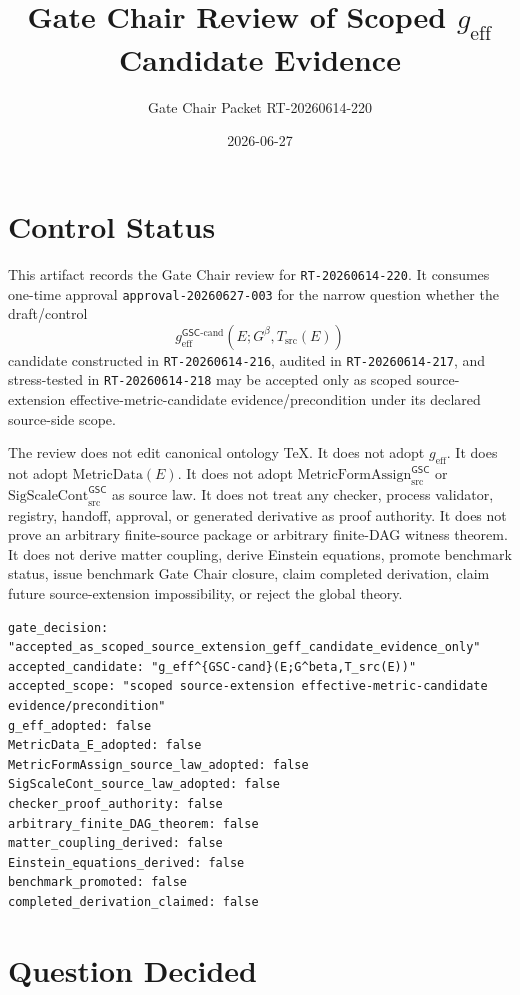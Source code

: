 \documentclass[11pt]{article}
\title{Gate Chair Review of Scoped \texorpdfstring{$g_{\mathrm{eff}}$}{g_eff} Candidate Evidence}
\author{Gate Chair Packet RT-20260614-220}
\date{2026-06-27}
\newcommand{\Gbeta}{G^\beta}
\newcommand{\SigScaleCont}{\mathrm{SigScaleCont}^{\mathsf{GSC}}_{\mathrm{src}}}
\newcommand{\MetricFormAssign}{\mathrm{MetricFormAssign}^{\mathsf{GSC}}_{\mathrm{src}}}
\newcommand{\geff}{g_{\mathrm{eff}}}
\newcommand{\geffCand}{g_{\mathrm{eff}}^{\mathsf{GSC}\mbox{-}\mathrm{cand}}}
\begin{document}
\maketitle

\section{Control Status}

This artifact records the Gate Chair review for \texttt{RT-20260614-220}. It
consumes one-time approval \texttt{approval-20260627-003} for the narrow
question whether the draft/control
\[
  \geffCand(E;\Gbeta,T_{\mathrm{src}}(E))
\]
candidate constructed in \texttt{RT-20260614-216}, audited in
\texttt{RT-20260614-217}, and stress-tested in \texttt{RT-20260614-218} may
be accepted only as scoped source-extension effective-metric-candidate
evidence/precondition under its declared source-side scope.

The review does not edit canonical ontology TeX. It does not adopt
\(\geff\). It does not adopt \(\mathrm{MetricData}(E)\). It does not adopt
\(\MetricFormAssign\) or \(\SigScaleCont\) as source law. It does not treat
any checker, process validator, registry, handoff, approval, or generated
derivative as proof authority. It does not prove an arbitrary finite-source
package or arbitrary finite-DAG witness theorem. It does not derive matter
coupling, derive Einstein equations, promote benchmark status, issue
benchmark Gate Chair closure, claim completed derivation, claim future
source-extension impossibility, or reject the global theory.

\begin{verbatim}
gate_decision: "accepted_as_scoped_source_extension_geff_candidate_evidence_only"
accepted_candidate: "g_eff^{GSC-cand}(E;G^beta,T_src(E))"
accepted_scope: "scoped source-extension effective-metric-candidate evidence/precondition"
g_eff_adopted: false
MetricData_E_adopted: false
MetricFormAssign_source_law_adopted: false
SigScaleCont_source_law_adopted: false
checker_proof_authority: false
arbitrary_finite_DAG_theorem: false
matter_coupling_derived: false
Einstein_equations_derived: false
benchmark_promoted: false
completed_derivation_claimed: false
\end{verbatim}

\section{Question Decided}
\end{document}
